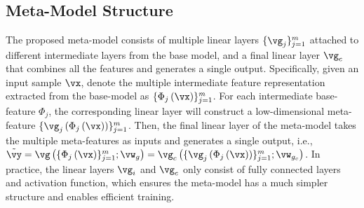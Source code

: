 \subsection{Meta-Model Structure}\label{subsec: model}
The proposed meta-model consists of multiple linear layers $\{\vg_j\}_{j=1}^{m}$ attached to different intermediate layers from the base model, and a final linear layer $\vg_{c}$ that combines all the features and generates a single output. Specifically, given an input sample $\vx$, denote the multiple intermediate feature representation extracted from the base-model as $\{\Phi_j\left(\vx\right)\}_{j=1}^{m}$. For each intermediate base-feature $\Phi_j$, the corresponding linear layer will construct a low-dimensional meta-feature $\{\vg_j\left(\Phi_j\left(\vx\right)\right)\}_{j=1}^{m}$. Then, the final linear layer of the meta-model takes the multiple meta-features as inputs and generates a single output, i.e., $\tilde{\vy} = \vg\left(\{\Phi_j\left(\vx\right)\}_{j=1}^{m}; \vw_g\right) = \vg_c\left(\{\vg_j\left(\Phi_j\left(\vx\right)\right)\}_{j=1}^{m}; \vw_{g_c}\right) $. In practice, the linear layers $\vg_{i}$ and $\vg_{c}$ only consist of fully connected layers and activation function, which ensures the meta-model has a much simpler structure and enables efficient training. 


